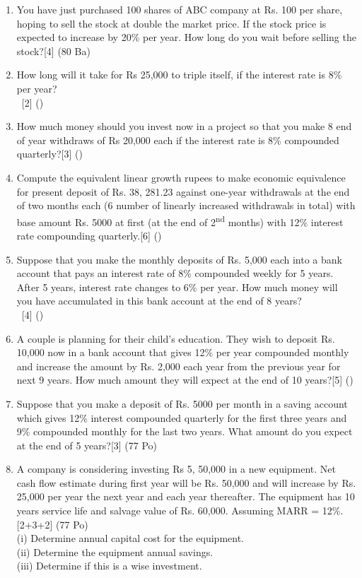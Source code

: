 \documentclass[12pt]{article}
\newcommand{\enter}{\\\textcolor{white}{1}}
\begin{document}
\begin{enumerate}
\item You have just purchased 100 shares of ABC company at Rs. 100 per share, hoping to sell the stock at double the market price. If the stock price is expected to increase by 20\% per year. How long do you wait before selling the stock?\hfill[4] (80 Ba)

\item How long will it take for Rs 25,000 to triple itself, if the interest rate is 8\% per year?
\enter\hfill[2] ()

\item How much money should you invest now in a project so that you make 8 end of year withdraws of Rs 20,000 each if the interest rate is 8\% compounded quarterly?\hfill[3] ()

\item Compute the equivalent linear growth rupees to make economic equivalence for present deposit of Rs. 38, 281.23 against one-year withdrawals at the end of two months each (6 number of linearly increased withdrawals in total) with base amount Rs. 5000 at first (at the end of 2\textsuperscript{nd} months) with 12\% interest rate compounding quarterly.\hfill[6] ()

\item Suppose that you make the monthly deposits of Rs. 5,000 each into a bank account that pays an interest rate of 8\% compounded weekly for 5 years. After 5 years, interest rate changes to 6\% per year. How much money will you have accumulated in this bank account at the end of 8 years?
\enter\hfill[4] ()

\item A couple is planning for their child's education. They wish to deposit Rs. 10,000 now in a bank account that gives 12\% per year compounded monthly and increase the amount by Rs. 2,000 each year from the previous year for next 9 years. How much amount they will expect at the end of 10 years?\hfill[5] ()

\item Suppose that you make a deposit of Rs. 5000 per month in a saving account which gives 12\% interest compounded quarterly for the first three years and 9\% compounded monthly for the last two years. What amount do you expect at the end of 5 years?\hfill[3] (77 Po)

\item A company is considering investing Rs 5, 50,000 in a new equipment. Net cash flow estimate during first year will be Rs. 50,000 and will increase by Rs. 25,000 per year the next year and each year thereafter. The equipment has 10 years service life and salvage value of Rs. 60,000. Assuming MARR = 12\%.\hfill[2+3+2] (77 Po)\\
(i) Determine annual capital cost for the equipment.\\
(ii) Determine the equipment annual savings.\\
(iii) Determine if this is a wise investment.


\end{enumerate}
\end{document}

